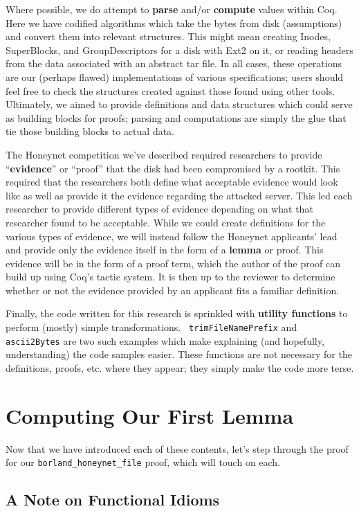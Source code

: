 \documentclass[nocopyrightspace]{sigplanconf}
\begin{document}
Where possible, we do attempt to {\bf parse} and/or {\bf compute} values
within Coq. Here we have codified algorithms which take the bytes from disk
(assumptions) and convert them into relevant structures. This might mean
creating Inodes, SuperBlocks, and GroupDescriptors for a disk with Ext2 on it,
or reading headers from the data associated with an abstract tar file. In all
cases, these operations are our (perhaps flawed) implementations of various
specifications; users should feel free to check the structures created against
those found using other tools. Ultimately, we aimed to provide definitions and
data structures which could serve as building blocks for proofs; parsing and
computations are simply the glue that tie those building blocks to actual
data.

The Honeynet competition we've described required researchers to provide
``{\bf evidence}'' or ``proof'' that the disk had been compromised by a
rootkit. This required that the researchers both define what acceptable
evidence would look like as well as provide it the evidence regarding the
attacked server. This led each researcher to provide different types of
evidence depending on what that researcher found to be acceptable. While we
could create definitions for the various types of evidence, we will instead
follow the Honeynet applicants' lead and provide only the evidence itself in
the form of a {\bf lemma} or proof. This evidence will be in the form of a
proof term, which the author of the proof can build up using Coq's tactic
system. It is then up to the reviewer to determine whether or not the evidence
provided by an applicant fits a familiar definition.

Finally, the code written for this research is sprinkled with {\bf utility
functions} to perform (mostly) simple transformations. {\tt
trimFileNamePrefix} and {\tt ascii2Bytes} are two such examples which make
explaining (and hopefully, understanding) the code samples easier. These
functions are not necessary for the definitions, proofs, etc. where they
appear; they simply make the code more terse.

\section{Computing Our First Lemma}

Now that we have introduced each of these contents, let's step through the
proof for our {\tt borland\_honeynet\_file} proof, which will touch on each.

\subsection{A Note on Functional Idioms}
\end{document}
